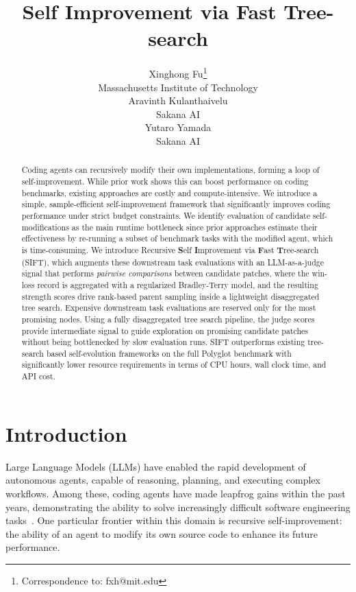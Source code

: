 \documentclass{article}
\title{Self Improvement via Fast Tree-search}
\author{%
  Xinghong Fu\thanks{Correspondence to: fxh@mit.edu} \\
  Massachusetts Institute of Technology \\
  \And
  Aravinth Kulanthaivelu \\
  Sakana AI \\
  \And
  Yutaro Yamada \\
  Sakana AI \\
}
\begin{document}
\maketitle


\begin{abstract}
Coding agents can recursively modify their own implementations, forming a loop of self-improvement.
While prior work shows this can boost performance on coding benchmarks, existing approaches are costly and compute-intensive.
We introduce a simple, sample-efficient self-improvement framework that significantly improves coding performance under strict budget constraints.
We identify evaluation of candidate self-modifications as the main runtime bottleneck since prior approaches estimate their effectiveness by re-running a subset of benchmark tasks with the modified agent, which is time-consuming.
We introduce Recursive \textbf{S}elf \textbf{I}mprovement via \textbf{F}ast \textbf{T}ree-search (SIFT), which augments these downstream task evaluations with an LLM-as-a-judge signal that performs \emph{pairwise comparisons} between candidate patches, where the win-loss record is aggregated with a regularized Bradley-Terry model, and the resulting strength scores drive rank-based parent sampling inside a lightweight disaggregated tree search. 
Expensive downstream task evaluations are reserved only for the most promising nodes. 
Using a fully disaggregated tree search pipeline, the judge scores provide intermediate signal to guide exploration on promising candidate patches without being bottlenecked by slow evaluation runs.
SIFT outperforms existing tree-search based self-evolution frameworks on the full Polyglot benchmark with significantly lower resource requirements in terms of CPU hours, wall clock time, and API cost.
\end{abstract}



\section{Introduction}

Large Language Models (LLMs) have enabled the rapid development of autonomous agents, capable of reasoning, planning, and executing complex workflows. Among these, coding agents have made leapfrog gains within the past years, demonstrating the ability to solve increasingly difficult software engineering tasks~\citep{jimenez2024swebench, jain2025livecodebench}. One particular frontier within this domain is recursive self-improvement: the ability of an agent to modify its own source code to enhance its future performance.
\end{document}
